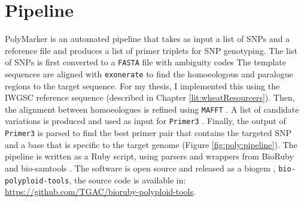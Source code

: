 \section{Pipeline}
PolyMarker is an automated pipeline that takes as input a list of SNPs and a reference file and produces a list of primer triplets for SNP genotyping. 
The list of SNPs is first converted to a \verb|FASTA| file with ambiguity codes \citep{Cornish-Bowden1985} 
The template sequences are aligned with \verb|exonerate| \citep{Slater2005}  to find the homoeologous and paralogue regions to the target sequence.
For my thesis, I implemented this using the IWGSC reference sequence (described in Chapter \ref{lit:wheatResourcers}).  
Then, the alignment between homoeologues is refined using \verb|MAFFT| \citep{Katoh2013}. 
A list of candidate variations is produced and used as input for \verb|Primer3| \citep{Rozen}. 
Finally, the output of \verb|Primer3| is parsed to find the best primer pair that contains the targeted SNP and a base that is specific to the target genome (Figure \ref{fig:poly:pipeline}).  
The pipeline is written as a Ruby script, using parsers and wrappers from BioRuby \citep{Goto2010} and bio-samtools \citep{Etherington2015,Ramirez-Gonzalez2012}. 
The software is open source and released as a biogem \citep{Bonnal2012}, \verb|bio-polyploid-tools|, the source code is available in: \url{https://github.com/TGAC/bioruby-polyploid-tools}.

